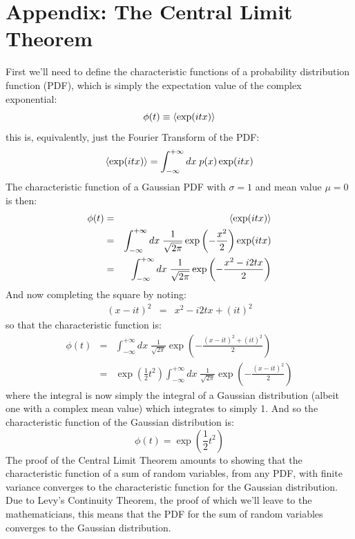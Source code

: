 \documentclass[12pt]{article}
\begin{document}
\newpage

\section{Appendix:  The Central Limit Theorem}

First we'll need to define the characteristic functions of a probability distribution function (PDF), which is simply the expectation value of the complex exponential:
\begin{equation*}   
\phi(t) \equiv \braket{\exp(itx)}  
\end{equation*}  
this is, equivalently, just the Fourier Transform of the PDF:
\begin{equation*}
\braket{\exp(itx)} = \int_{-\infty}^{+\infty} dx \; p(x) \exp(itx)
\end{equation*}
The characteristic function of a Gaussian PDF with $\sigma=1$ and mean value $\mu=0$ is then:
\begin{eqnarray*}
\phi(t) &=& \braket{\exp(itx)}\\
&=& \int_{-\infty}^{+\infty} dx \; \frac{1}{\sqrt{2\pi}} \exp\left(-\frac{x^2}{2}\right)\exp(itx)\\
&=& \int_{-\infty}^{+\infty} dx \; \frac{1}{\sqrt{2\pi}} \exp\left(-\frac{x^2-i2tx}{2}\right)
\end{eqnarray*}
And now completing the square by noting:
\begin{eqnarray*}
(x-it)^2 &=& x^2 - i2tx + (it)^2 
\end{eqnarray*}
so that the characteristic function is:
\begin{eqnarray*}
\phi(t) &=& \int_{-\infty}^{+\infty} dx \; \frac{1}{\sqrt{2\pi}} \exp\left(-\frac{(x-it)^2+(it)^2}{2}\right)\\
&=& \exp\left(\frac{1}{2}t^2\right)\int_{-\infty}^{+\infty} dx \; \frac{1}{\sqrt{2\pi}} \exp\left(-\frac{(x-it)^2}{2}\right)
\end{eqnarray*}   
where the integral is now simply the integral of a Gaussian distribution (albeit one with a complex mean value) which integrates to simply 1.  And so the characteristic function of the Gaussian distribution is:
\begin{equation}
\phi(t) = \exp\left(\frac{1}{2}t^2\right) \label{eqn:cfn}
\end{equation}
 The proof of the Central Limit Theorem amounts to showing that the characteristic function of a sum of random variables, from any PDF, with finite variance converges to the characteristic function for the Gaussian distribution.  Due to Levy's Continuity Theorem, the proof of which we'll leave to the mathematicians, this means that the PDF for the sum of random variables converges to the Gaussian distribution.
\end{document}

